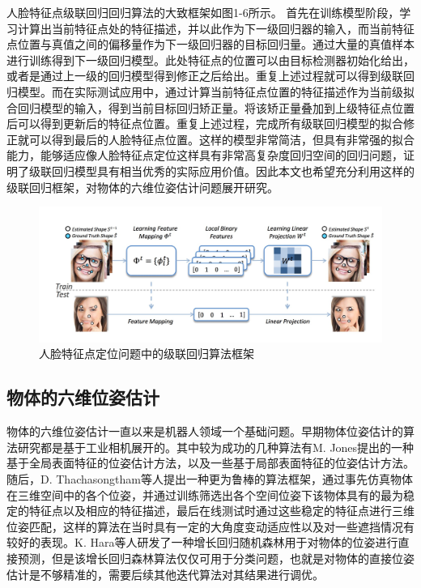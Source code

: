 人脸特征点级联回归回归算法的大致框架如图1-6所示。
首先在训练模型阶段，学习计算出当前特征点处的特征描述，并以此作为下一级回归器的输入，而当前特征点位置与真值之间的偏移量作为下一级回归器的目标回归量。通过大量的真值样本进行训练得到下一级回归模型。此处特征点的位置可以由目标检测器初始化给出，或者是通过上一级的回归模型得到修正之后给出。重复上述过程就可以得到级联回归模型。而在实际测试应用中，通过计算当前特征点位置的特征描述作为当前级拟合回归模型的输入，得到当前目标回归矫正量。将该矫正量叠加到上级特征点位置后可以得到更新后的特征点位置。重复上述过程，完成所有级联回归模型的拟合修正就可以得到最后的人脸特征点位置。这样的模型非常简洁，但具有非常强的拟合能力，能够适应像人脸特征点定位这样具有非常高复杂度回归空间的回归问题，证明了级联回归模型具有相当优秀的实际应用价值。因此本文也希望充分利用这样的级联回归框架，对物体的六维位姿估计问题展开研究。
\begin{figure}[htb]
	\centering 
	\includegraphics[width=\textwidth]{./mypic/人脸回归算法框架.jpg} 
	\caption{人脸特征点定位问题中的级联回归算法框架} 
\end{figure}

\subsection{物体的六维位姿估计}

物体的六维位姿估计一直以来是机器人领域一个基础问题。早期物体位姿估计的算法研究都是基于工业相机展开的。其中较为成功的几种算法有M. Jones提出的一种基于全局表面特征的位姿估计方法\cite{jones2003fast}，以及一些基于局部表面特征的位姿估计方法\cite{schmid1996combining}\cite{rothganger20033d}。随后，D. Thachasongtham等人提出一种更为鲁棒的算法框架，通过事先仿真物体在三维空间中的各个位姿，并通过训练筛选出各个空间位姿下该物体具有的最为稳定的特征点以及相应的特征描述，最后在线测试时通过这些稳定的特征点进行三维位姿匹配\cite{thachasongtham20133d}，这样的算法在当时具有一定的大角度变动适应性以及对一些遮挡情况有较好的表现。K. Hara等人研发了一种增长回归随机森林用于对物体的位姿进行直接预测\cite{hara2014growing}，但是该增长回归森林算法仅仅可用于分类问题，也就是对物体的直接位姿估计是不够精准的，需要后续其他迭代算法对其结果进行调优。

